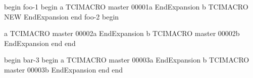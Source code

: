 begin
foo-1
begin
a
TCIMACRO
master 00001a
EndExpansion
b
TCIMACRO
NEW
EndExpansion
end
foo-2
begin

a
TCIMACRO
master 00002a
EndExpansion
b
TCIMACRO
master 00002b
EndExpansion
end
end

begin
bar-3
begin
a
TCIMACRO
master 00003a
EndExpansion
b
TCIMACRO
master 00003b
EndExpansion
end
end
